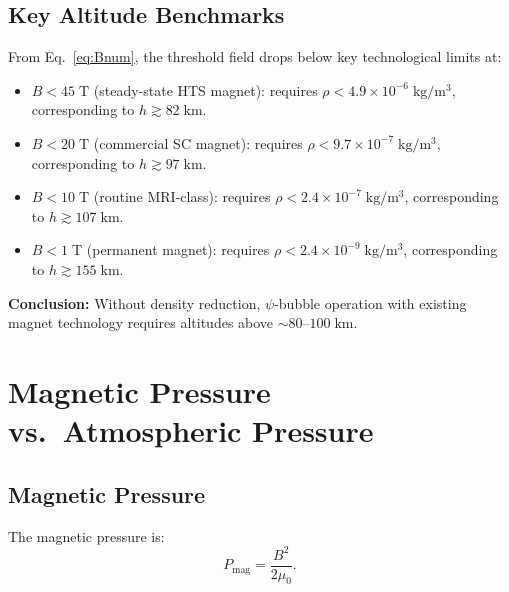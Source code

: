 \documentclass[11pt,a4paper]{article}
\begin{document}
\subsection{Key Altitude Benchmarks}

From Eq.~\eqref{eq:Bnum}, the threshold field drops below key technological limits at:

\begin{itemize}
\item $B < 45\;\mathrm{T}$ (steady-state HTS magnet): requires $\rho < 4.9 \times 10^{-6}\;\mathrm{kg/m^3}$, corresponding to $h \gtrsim 82\;\mathrm{km}$.
\item $B < 20\;\mathrm{T}$ (commercial SC magnet): requires $\rho < 9.7 \times 10^{-7}\;\mathrm{kg/m^3}$, corresponding to $h \gtrsim 97\;\mathrm{km}$.
\item $B < 10\;\mathrm{T}$ (routine MRI-class): requires $\rho < 2.4 \times 10^{-7}\;\mathrm{kg/m^3}$, corresponding to $h \gtrsim 107\;\mathrm{km}$.
\item $B < 1\;\mathrm{T}$ (permanent magnet): requires $\rho < 2.4 \times 10^{-9}\;\mathrm{kg/m^3}$, corresponding to $h \gtrsim 155\;\mathrm{km}$.
\end{itemize}

\textbf{Conclusion:} Without density reduction, $\psi$-bubble operation with
existing magnet technology requires altitudes above $\sim 80$--$100\;\mathrm{km}$.

\section{Magnetic Pressure vs.\ Atmospheric Pressure}\label{sec:pressure}

\subsection{Magnetic Pressure}

The magnetic pressure is:
\begin{equation}\label{eq:Pmag}
P_{\mathrm{mag}} = \frac{B^2}{2\mu_0}.
\end{equation}
\end{document}
